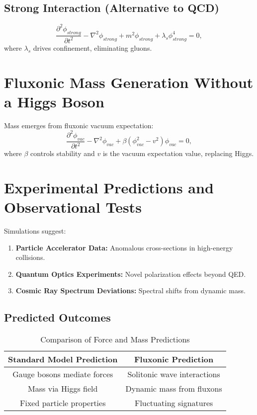 \documentclass{article}
\begin{document}
\subsection{Strong Interaction (Alternative to QCD)}
\begin{equation}
\frac{\partial^2 \phi_{strong}}{\partial t^2} - \nabla^2 \phi_{strong} + m^2 \phi_{strong} + \lambda_s \phi_{strong}^4 = 0,
\end{equation}
where \(\lambda_s\) drives confinement, eliminating gluons.

\section{Fluxonic Mass Generation Without a Higgs Boson}
Mass emerges from fluxonic vacuum expectation:
\begin{equation}
\frac{\partial^2 \phi_{vac}}{\partial t^2} - \nabla^2 \phi_{vac} + \beta (\phi_{vac}^2 - v^2) \phi_{vac} = 0,
\end{equation}
where \(\beta\) controls stability and \(v\) is the vacuum expectation value, replacing Higgs.

\section{Experimental Predictions and Observational Tests}
Simulations suggest:
\begin{enumerate}
    \item \textbf{Particle Accelerator Data:} Anomalous cross-sections in high-energy collisions.
    \item \textbf{Quantum Optics Experiments:} Novel polarization effects beyond QED.
    \item \textbf{Cosmic Ray Spectrum Deviations:} Spectral shifts from dynamic mass.
\end{enumerate}

\subsection{Predicted Outcomes}
\begin{table}[h]
    \centering
    \begin{tabular}{|c|c|}
        \hline
        \textbf{Standard Model Prediction} & \textbf{Fluxonic Prediction} \\
        \hline
        Gauge bosons mediate forces & Solitonic wave interactions \\
        Mass via Higgs field & Dynamic mass from fluxons \\
        Fixed particle properties & Fluctuating signatures \\
        \hline
    \end{tabular}
    \caption{Comparison of Force and Mass Predictions}
    \label{tab:predictions}
\end{table}
\end{document}
